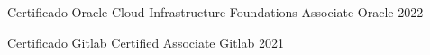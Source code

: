 

\begin{cvhonors}


\cvhonor
  {Certificado} %
  {Oracle Cloud Infrastructure Foundations Associate} %
  {Oracle} %
  {2022} %


  \cvhonor
    {Certificado} %
    {Gitlab Certified Associate} %
    {Gitlab} %
    {2021} %

\end{cvhonors}

